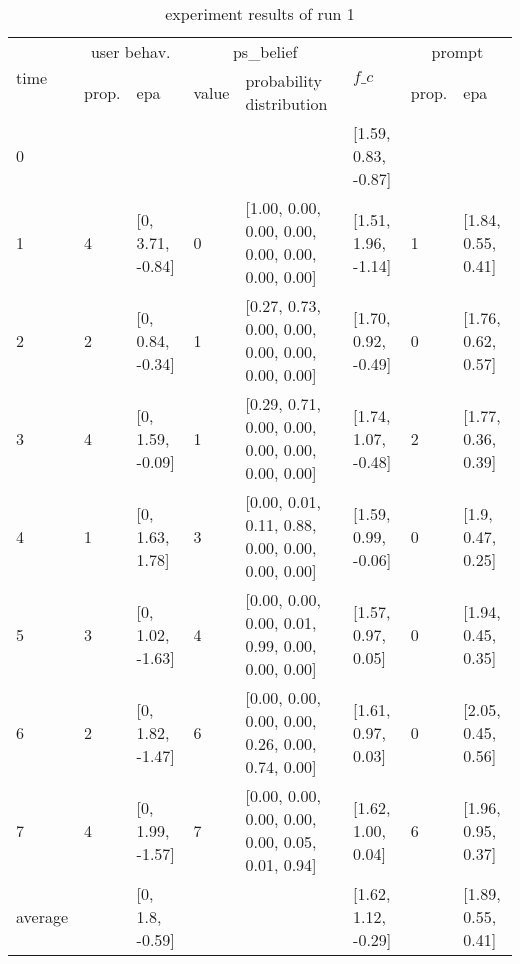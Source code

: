\begin{table}[htbp]\footnotesize
\caption{experiment results of run 1}
\begin{center}
\begin{tabular}{|p{0.4cm}|p{0.6cm}|l|p{0.6cm}|p{3.3cm}|l|p{0.6cm}|l|}
\hline

\multirow{2}{*}{time} & \multicolumn{2}{c|}{user behav.} & \multicolumn{2}{c|}{ps\_belief} &
\multirow{2}{*}{$f\_c$} & \multicolumn{2}{c|}{prompt} \\ \cline{2-5}\cline{ 7- 8}
& prop. & epa & value & probability distribution &  & prop. & epa \\ \hline

0 & \multicolumn{ 1}{l|}{} &  & \multicolumn{1}{l|}{} &  & [1.59, 0.83, -0.87] & \multicolumn{ 1}{l|}{} &  \\ \hline
1 & 4 & [0, 3.71, -0.84] & 0 & [1.00, 0.00, 0.00, 0.00, 0.00, 0.00, 0.00, 0.00] & [1.51, 1.96, -1.14] & 1 & [1.84, 0.55, 0.41] \\ \hline
2 & 2 & [0, 0.84, -0.34] & 1 & [0.27, 0.73, 0.00, 0.00, 0.00, 0.00, 0.00, 0.00] & [1.70, 0.92, -0.49] & 0 & [1.76, 0.62, 0.57] \\ \hline
3 & 4 & [0, 1.59, -0.09] & 1 & [0.29, 0.71, 0.00, 0.00, 0.00, 0.00, 0.00, 0.00] & [1.74, 1.07, -0.48] & 2 & [1.77, 0.36, 0.39] \\ \hline
4 & 1 & [0, 1.63, 1.78] & 3 & [0.00, 0.01, 0.11, 0.88, 0.00, 0.00, 0.00, 0.00] & [1.59, 0.99, -0.06] & 0 & [1.9, 0.47, 0.25] \\ \hline
5 & 3 & [0, 1.02, -1.63] & 4 & [0.00, 0.00, 0.00, 0.01, 0.99, 0.00, 0.00, 0.00] & [1.57, 0.97, 0.05] & 0 & [1.94, 0.45, 0.35] \\ \hline
6 & 2 & [0, 1.82, -1.47] & 6 & [0.00, 0.00, 0.00, 0.00, 0.26, 0.00, 0.74, 0.00] & [1.61, 0.97, 0.03] & 0 & [2.05, 0.45, 0.56] \\ \hline
7 & 4 & [0, 1.99, -1.57] & 7 & [0.00, 0.00, 0.00, 0.00, 0.00, 0.05, 0.01, 0.94] & [1.62, 1.00, 0.04] & 6 & [1.96, 0.95, 0.37] \\ \hline
\multicolumn{1}{|l|}{average} & \multicolumn{1}{l|}{} & [0, 1.8, -0.59] & \multicolumn{1}{l|}{} &  & [1.62, 1.12, -0.29] & \multicolumn{1}{l|}{} & [1.89, 0.55, 0.41] \\ \hline
\end{tabular}
\end{center}
\label{}
\end{table}




